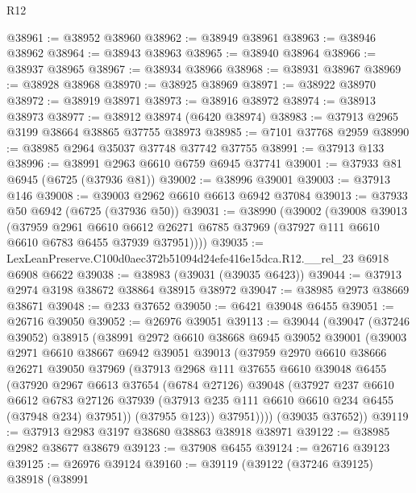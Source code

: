 \begin{lexlean}{R12}
\begin{coremodule}
@38961 := @38952 @38960
@38962 := @38949 @38961
@38963 := @38946 @38962
@38964 := @38943 @38963
@38965 := @38940 @38964
@38966 := @38937 @38965
@38967 := @38934 @38966
@38968 := @38931 @38967
@38969 := @38928 @38968
@38970 := @38925 @38969
@38971 := @38922 @38970
@38972 := @38919 @38971
@38973 := @38916 @38972
@38974 := @38913 @38973
@38977 := @38912 @38974 (@6420 @38974)
@38983 := @37913 @2965 @3199 @38664 @38865 @37755 @38973
@38985 := @7101 @37768 @2959
@38990 := @38985 @2964 @35037 @37748 @37742 @37755
@38991 := @37913 @133
@38996 := @38991 @2963 @6610 @6759 @6945 @37741
@39001 := @37933 @81 @6945 (@6725 (@37936 @81))
@39002 := @38996 @39001
@39003 := @37913 @146
@39008 := @39003 @2962 @6610 @6613 @6942 @37084
@39013 := @37933 @50 @6942 (@6725 (@37936 @50))
@39031 := @38990
    (@39002
      (@39008
        @39013
        (@37959
          @2961
          @6610
          @6612
          @26271
          @6785
          @37969
          (@37927 @111 @6610 @6610 @6783 @6455 @37939 @37951))))
@39035 := LexLeanPreserve.C100d0aec372b51094d24efe416e15dca.R12.__rel_23 @6918 @6908 @6622
@39038 := @38983 (@39031 (@39035 @6423))
@39044 := @37913 @2974 @3198 @38672 @38864 @38915 @38972
@39047 := @38985 @2973 @38669 @38671
@39048 := @233 @37652
@39050 := @6421 @39048 @6455
@39051 := @26716 @39050
@39052 := @26976 @39051
@39113 := @39044
    (@39047
      (@37246 @39052)
      @38915
      (@38991
        @2972
        @6610
        @38668
        @6945
        @39052
        @39001
        (@39003
          @2971
          @6610
          @38667
          @6942
          @39051
          @39013
          (@37959
            @2970
            @6610
            @38666
            @26271
            @39050
            @37969
            (@37913
              @2968
              @111
              @37655
              @6610
              @39048
              @6455
              (@37920
                @2967
                @6613
                @37654
                (@6784 @27126)
                @39048
                (@37927
                  @237
                  @6610
                  @6612
                  @6783
                  @27126
                  @37939
                  (@37913 @235 @111 @6610 @6610 @234 @6455 (@37948 @234) @37951))
                (@37955 @123))
              @37951))))
      (@39035 @37652))
@39119 := @37913 @2983 @3197 @38680 @38863 @38918 @38971
@39122 := @38985 @2982 @38677 @38679
@39123 := @37908 @6455
@39124 := @26716 @39123
@39125 := @26976 @39124
@39160 := @39119
    (@39122
      (@37246 @39125)
      @38918
      (@38991

\end{coremodule}
\end{lexlean}
